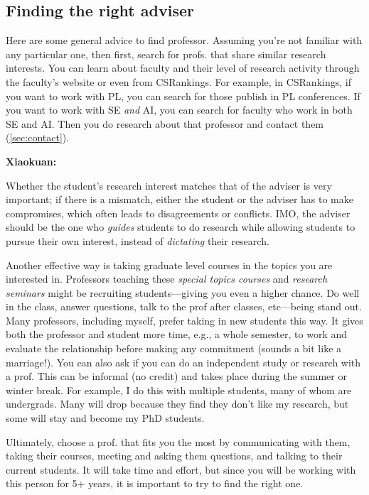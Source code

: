 \documentclass[oneside,11pt]{memoir}
\newenvironment{commentbox}[1][]{
  \small
  \begin{mybox}
    {\small \textbf{#1}}
  }{
  \end{mybox}
}
\begin{document}
\subsection{Finding the right adviser}

Here are some general advice to find professor.  Assuming you're not familiar with any particular one, then first, search for profs. that share similar research interests. You can learn about faculty and their level of research activity through the faculty's website or even from CSRankings.  For example, in CSRankings, if you want to work with PL, you can search for those publish in PL conferences.  If you want to work with SE \emph{and} AI, you can search for faculty who work in both SE and AI.  Then you do research about that professor and contact them (\autoref{sec:contact}).

\begin{commentbox}[Xiaokuan:]
  Whether the student's research interest matches that of the adviser is very important;
  if there is a mismatch,
  either the student or the adviser has to make compromises,
  which often leads to disagreements or conflicts.
  IMO, the adviser should be the one who \emph{guides}  students to do research while allowing students to pursue their own interest,
  instead of \emph{dictating} their research.
\end{commentbox}


Another effective way is taking graduate level courses in the topics you are interested in.  Professors teaching these \emph{special topics courses} and \emph{research seminars} might be recruiting students---giving you even a higher chance. Do well in the class, answer questions, talk to the prof after classes, etc---being stand out.  Many professors, including myself, prefer taking in new students this way.  It gives both the professor and student more time, e.g., a whole semester, to work and evaluate the relationship before making any commitment (sounds a bit like a marriage!).
You can also ask if you can do an independent study or research with a prof. This can be informal (no credit) and takes place during the summer or winter break.  For example, I do this with multiple students, many of whom are undergrads. Many will drop because they find they don't like my research, but some will stay and become my PhD students.

Ultimately, choose a prof. that fits you the most by communicating with them, taking their courses, meeting and asking them questions, and talking to their current students. It will take time and effort, but since you will be working with this person for 5+ years, it is important to try to find the right one.
\end{document}
